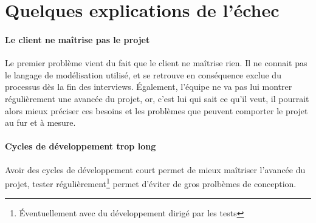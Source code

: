 	\section*{Quelques explications de l'échec}
	\paragraph{Le client ne maîtrise pas le projet} Le premier problème vient du fait que le client ne maîtrise rien. Il ne connait pas le langage de modélisation utilisé, et se retrouve en conséquence 
	exclue du processus dès la fin des interviews. Également, l'équipe ne va pas lui montrer régulièrement une avancée du projet, or, c'est lui qui sait ce qu'il veut, il pourrait alors mieux préciser ces besoins
	et les problèmes que peuvent comporter le projet au fur et à mesure.
	\paragraph{Cycles de développement trop long} Avoir des cycles de développement court permet de mieux maîtriser l'avancée du projet, tester 
	régulièrement\footnote{Éventuellement avec du développement dirigé par les tests} permet d'éviter de gros prolbèmes de conception. 

	
	


	
		
